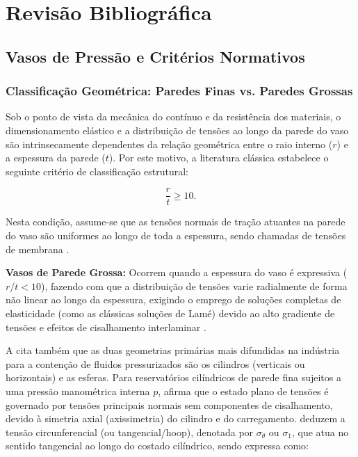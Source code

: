 \chapter{Revisão Bibliográfica}

\section{Vasos de Pressão e Critérios Normativos}

\subsection{Classificação Geométrica: Paredes Finas vs. Paredes Grossas}

Sob o ponto de vista da mecânica do contínuo e da resistência dos materiais, o dimensionamento elástico e a distribuição de tensões ao longo da parede do vaso são intrinsecamente dependentes da relação geométrica entre o raio interno ($r$) e a espessura da parede ($t$). Por este motivo, a literatura clássica estabelece o seguinte critério de classificação estrutural:

\begin{equation}
\frac{r}{t} \ge 10.    
\end{equation}\label{eq-limite-parede-fina}

Nesta condição, assume-se que as tensões normais de tração atuantes na parede do vaso são uniformes ao longo de toda a espessura, sendo chamadas de tensões de membrana \cite{asme_sec8_div1_2019}.

\textbf{Vasos de Parede Grossa:} Ocorrem quando a espessura do vaso é expressiva ($r/t < 10$), fazendo com que a distribuição de tensões varie radialmente de forma não linear ao longo da espessura, exigindo o emprego de soluções completas de elasticidade (como as clássicas soluções de Lamé) devido ao alto gradiente de tensões e efeitos de cisalhamento interlaminar \cite{Sadd2009}.

A  cita também que as duas geometrias primárias mais difundidas na indústria para a contenção de fluidos pressurizados são os cilindros (verticais ou horizontais) e as esferas. Para reservatórios cilíndricos de parede fina sujeitos a uma pressão manométrica interna $p$,  afirma que o estado plano de tensões é governado por tensões principais normais sem componentes de cisalhamento, devido à simetria axial (axissimetria) do cilindro e do carregamento.  deduzem a tensão circunferencial (ou tangencial/hoop), denotada por $\sigma_\theta$ ou $\sigma_1$, que atua no sentido tangencial ao longo do costado cilíndrico, sendo expressa como:

